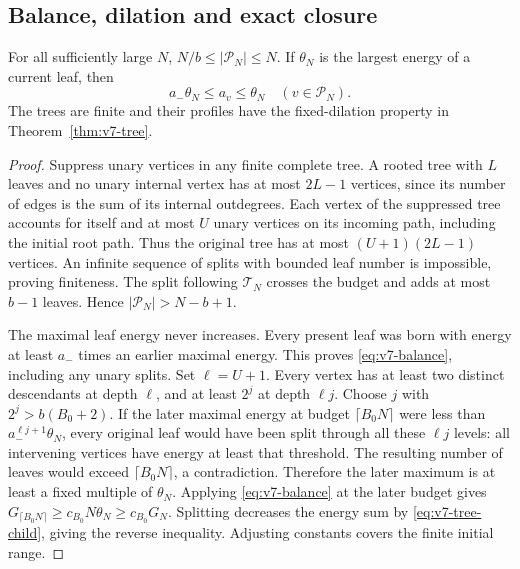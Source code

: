 \subsection{Balance, dilation and exact closure}
\begin{lemma}\label{lem:v7-balance}
For all sufficiently large $N$, $N/b\le |\mathcal P_N|\le N$. If
$\theta_N$ is the largest energy of a current leaf, then
\begin{equation}
        a_-\theta_N\le a_v\le\theta_N
                      \quad(v\in\mathcal P_N).       \label{eq:v7-balance}
\end{equation}
The trees are finite and their profiles have the fixed-dilation property
in Theorem~\ref{thm:v7-tree}.
\end{lemma}
\begin{proof}
Suppress unary vertices in any finite complete tree. A rooted tree with
$L$ leaves and no unary internal vertex has at most $2L-1$ vertices,
since its number of edges is the sum of its internal outdegrees. Each
vertex of the suppressed tree accounts for itself and at most $U$
unary vertices on its incoming path, including the initial root path.
Thus the original tree has at most $(U+1)(2L-1)$ vertices. An infinite
sequence of splits with bounded leaf number is impossible, proving
finiteness. The split following $\mathcal T_N$ crosses the budget and
adds at most $b-1$ leaves. Hence $|\mathcal P_N|>N-b+1$.

The maximal leaf energy never increases. Every present leaf was born
with energy at least $a_-$ times an earlier maximal energy. This proves
\eqref{eq:v7-balance}, including any unary splits. Set $\ell=U+1$.
Every vertex has at least two distinct descendants at depth $\ell$, and
at least $2^j$ at depth $\ell j$. Choose $j$ with $2^j>b(B_0+2)$.
If the later maximal energy at budget $\lceil B_0N\rceil$ were less
than $a_-^{\ell j+1}\theta_N$, every original leaf would have been split
through all these $\ell j$ levels: all intervening vertices have energy
at least that threshold. The resulting number of leaves would exceed
$\lceil B_0N\rceil$, a contradiction. Therefore the later maximum is
at least a fixed multiple of $\theta_N$. Applying
\eqref{eq:v7-balance} at the later budget gives
$G_{\lceil B_0N\rceil}\ge c_{B_0}N\theta_N\ge c_{B_0}G_N$.
Splitting decreases the energy sum by \eqref{eq:v7-tree-child}, giving
the reverse inequality. Adjusting constants covers the finite initial
range.
\end{proof}

